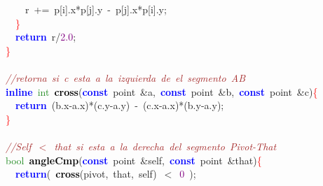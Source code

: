 \documentclass[10pt,a4paper,twoside]{article}
\begin{document}
{{{{{{{{{{\mbox{}\ \ \ \ r\ \textcolor{BrickRed}{+=}\ p\textcolor{BrickRed}{[}i\textcolor{BrickRed}{].}x\textcolor{BrickRed}{*}p\textcolor{BrickRed}{[}j\textcolor{BrickRed}{].}y\ \textcolor{BrickRed}{-}\ p\textcolor{BrickRed}{[}j\textcolor{BrickRed}{].}x\textcolor{BrickRed}{*}p\textcolor{BrickRed}{[}i\textcolor{BrickRed}{].}y\textcolor{BrickRed}{;} \\
\mbox{}\ \ \textcolor{Red}{\}} \\
\mbox{}\ \ \textbf{\textcolor{Blue}{return}}\ r\textcolor{BrickRed}{/}\textcolor{Purple}{2.0}\textcolor{BrickRed}{;} \\
\mbox{}\textcolor{Red}{\}} \\
\mbox{} \\
\mbox{}\textit{\textcolor{Brown}{//retorna\ si\ c\ esta\ a\ la\ izquierda\ de\ el\ segmento\ AB}} \\
\mbox{}\textbf{\textcolor{Blue}{inline}}\ \textcolor{ForestGreen}{int}\ \textbf{\textcolor{Black}{cross}}\textcolor{BrickRed}{(}\textbf{\textcolor{Blue}{const}}\ point\ \textcolor{BrickRed}{\&}a\textcolor{BrickRed}{,}\ \textbf{\textcolor{Blue}{const}}\ point\ \textcolor{BrickRed}{\&}b\textcolor{BrickRed}{,}\ \textbf{\textcolor{Blue}{const}}\ point\ \textcolor{BrickRed}{\&}c\textcolor{BrickRed}{)}\textcolor{Red}{\{} \\
\mbox{}\ \ \textbf{\textcolor{Blue}{return}}\ \textcolor{BrickRed}{(}b\textcolor{BrickRed}{.}x\textcolor{BrickRed}{-}a\textcolor{BrickRed}{.}x\textcolor{BrickRed}{)*(}c\textcolor{BrickRed}{.}y\textcolor{BrickRed}{-}a\textcolor{BrickRed}{.}y\textcolor{BrickRed}{)}\ \textcolor{BrickRed}{-}\ \textcolor{BrickRed}{(}c\textcolor{BrickRed}{.}x\textcolor{BrickRed}{-}a\textcolor{BrickRed}{.}x\textcolor{BrickRed}{)*(}b\textcolor{BrickRed}{.}y\textcolor{BrickRed}{-}a\textcolor{BrickRed}{.}y\textcolor{BrickRed}{);} \\
\mbox{}\textcolor{Red}{\}} \\
\mbox{} \\
\mbox{}\textit{\textcolor{Brown}{//Self\ $<$\ that\ si\ esta\ a\ la\ derecha\ del\ segmento\ Pivot-That}} \\
\mbox{}\textcolor{ForestGreen}{bool}\ \textbf{\textcolor{Black}{angleCmp}}\textcolor{BrickRed}{(}\textbf{\textcolor{Blue}{const}}\ point\ \textcolor{BrickRed}{\&}self\textcolor{BrickRed}{,}\ \textbf{\textcolor{Blue}{const}}\ point\ \textcolor{BrickRed}{\&}that\textcolor{BrickRed}{)}\textcolor{Red}{\{} \\
\mbox{}\ \ \textbf{\textcolor{Blue}{return}}\textcolor{BrickRed}{(}\ \textbf{\textcolor{Black}{cross}}\textcolor{BrickRed}{(}pivot\textcolor{BrickRed}{,}\ that\textcolor{BrickRed}{,}\ self\textcolor{BrickRed}{)}\ \textcolor{BrickRed}{$<$}\ \textcolor{Purple}{0}\ \textcolor{BrickRed}{);} \\
}}}}}}}}}}
\end{document}
